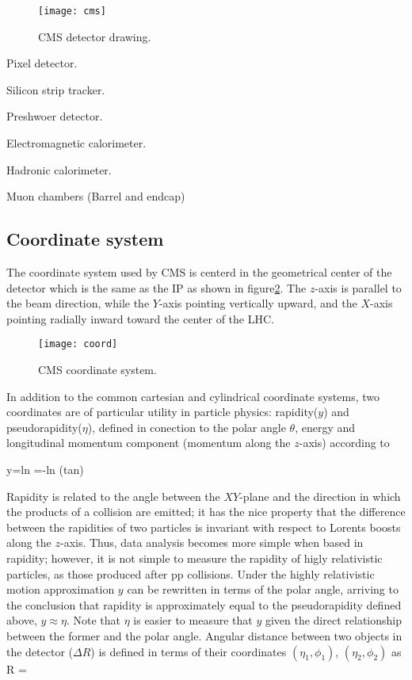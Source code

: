 \begin{figure}[!h]
  \centering
  \texttt{[image: cms]}
  \caption[CMS detector drawing]{CMS detector drawing\cite{cms_drawing}.}
  \label{fig:cms}
\end{figure}

\noindent 

\bit
\item Pixel detector.
\item Silicon strip tracker.
\item Preshwoer detector.
\item Electromagnetic calorimeter.
\item Hadronic calorimeter.
\item Muon chambers (Barrel and endcap)
\eit

\subsection{Coordinate system}
\noindent The coordinate system used by CMS is centerd in the geometrical center of the detector which is the same as the IP as shown in figure\ref{fig:coord}. The $z$-axis is parallel to the beam direction, while the $Y$-axis pointing vertically upward, and the $X$-axis pointing radially inward toward the center of the LHC.

\begin{figure}[h!]
  \centering
  \texttt{[image: coord]}
  \caption[CMS coordinate system]{CMS coordinate system.}
  \label{fig:coord}
\end{figure}

\noindent In addition to the common cartesian and cylindrical coordinate systems, two coordinates are of particular utility in particle physics: rapidity($y$) and pseudorapidity($\eta$), defined in conection to the polar angle $\theta$, energy and longitudinal momentum component (momentum along the $z$-axis) according to

\beqn
y=ln \qquad \eta=-ln \left(tan\right)
\label{eqn:eta}
\eeqn

\noindent Rapidity is related to the angle between the $XY$-plane and the direction in which the products of a collision are emitted; it has the nice property that the difference between the rapidities of two particles is invariant with respect to Lorents boosts along the $z$-axis. Thus, data analysis becomes more simple when based in rapidity; however, it is not simple to measure the rapidity of higly relativistic particles, as those produced after pp collisions. Under the highly relativistic motion approximation $y$ can be rewritten in terms of the polar angle, arriving to the conclusion that rapidity is approximately equal to the pseudorapidity defined above, \ie $y\approx\eta$. Note that $\eta$ is easier to measure that $y$ given the direct relationship between the former and the polar angle. Angular distance between two objects in the detector ($\Delta R$) is defined in terms of their coordinates $(\eta_1,\phi_1)$, $(\eta_2,\phi_2)$ as
\beqn
\Delta R = 
\eeqn

